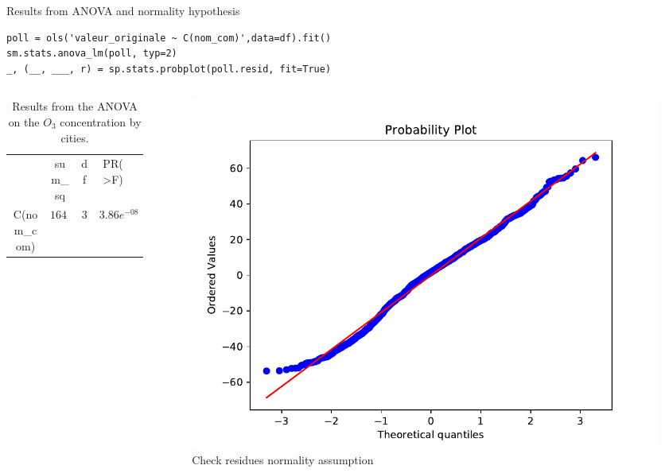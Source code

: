 \documentclass[unknownkeysallowed]{beamer}
\begin{document}
\begin{Framecode}{Results from ANOVA and normality hypothesis}

\begin{verbatim}
poll = ols('valeur_originale ~ C(nom_com)',data=df).fit()
sm.stats.anova_lm(poll, typ=2) 
_, (__, ___, r) = sp.stats.probplot(poll.resid, fit=True)
\end{verbatim}

\begin{columns}
\begin{column}[T]{.55\textwidth}
 \vspace{.5cm}
\begin{table}
\caption{Results from the ANOVA on the $O_3$ concentration by cities.}
\setlength{\tabcolsep}{0.7\tabcolsep}
\begin{tabular}{|c|c|c|c|c|}
\hline
 &  sum\_sq      &  df    &  PR(>F) \\
    \small{C(nom\_com)} &  $16471.58$    & $3$  & $3.86e^{-08}$ \\
    \hline
\end{tabular}
\end{table}


\end{column}
\begin{column}[T]{.44\textwidth}

\begin{figure}
    \centering
    \includegraphics[width=\textwidth]{Verification_of_residues.pdf}
    \caption{Check residues normality assumption}
    \label{fig:check_res}
\end{figure}
\end{column}
\end{columns}    
\end{Framecode}
\end{document}
